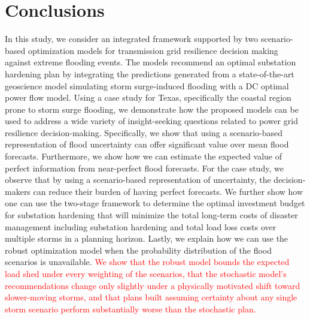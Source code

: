\documentclass[authoryear,preprint,review,12pt]{elsarticle}\usepackage{amssymb}
\begin{document}

\section{Conclusions}\label{conclusions}

In this study, we consider an integrated framework supported by two scenario-based optimization models for transmission grid resilience decision making against extreme flooding events. The models recommend an optimal substation hardening plan by integrating the predictions generated from a state-of-the-art geoscience model simulating storm surge-induced flooding with a DC optimal power flow model. Using a case study for Texas, specifically the coastal region prone to storm surge flooding, we demonstrate how the proposed models can be used to address a wide variety of insight-seeking questions related to power grid resilience decision-making. Specifically, we show that using a scenario-based representation of flood uncertainty can offer significant value over mean flood forecasts. 
Furthermore, we show how we can estimate the expected value of perfect information from near-perfect flood forecasts. For the case study, we observe that by using a scenario-based representation of uncertainty, the decision-makers can reduce their burden of having perfect forecasts. We further show how one can use the two-stage framework to determine the optimal investment budget for substation hardening that will minimize the total long-term costs of disaster management including substation hardening and total load loss costs over multiple storms in a planning horizon. Lastly, we explain how we can use the robust optimization model when the probability distribution of the flood scenarios is unavailable. \textcolor{red}{We show that the robust model bounds the expected load shed under every weighting of the scenarios, that the stochastic model's recommendations change only slightly under a physically motivated shift toward slower-moving storms, and that plans built assuming certainty about any single storm scenario perform substantially worse than the stochastic plan.}
\end{document}
